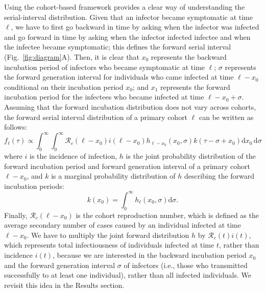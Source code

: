\documentclass[12pt]{article}
\newcommand{\fref}[1]{Fig.~\ref{fig:#1}}
\begin{document}
Using the cohort-based framework provides a clear way of understanding the serial-interval distribution.
Given that an infector became symptomatic at time $\ell$, we have to first go backward in time by asking when the infector was infected and go forward in time by asking when the infector infected infectee and when the infectee became symptomatic;
this defines the forward serial interval (\fref{diagram}A).
Then, it is clear that $x_0$ represents the backward incubation period of infectors who became symptomatic at time $\ell$; 
$\sigma$ represents the forward generation interval for individuals who came infected at time $\ell - x_0$ conditional on their incubation period $x_0$;
and $x_1$ represents the forward incubation period for the infectees who became infected at time $\ell - x_0 + \sigma$.
Assuming that the forward incubation distribution does not vary across cohorts, the forward serial interval distribution of a primary cohort $\ell$ can be written as follows:
\begin{equation}
f_\ell(\tau) \propto \int_{0}^\infty \int_{0}^\infty \mathcal R_c (\ell - x_0) i(\ell - x_0) h_{\ell - x_0}(x_0, \sigma) k(\tau-\sigma+x_0) \mathrm{d} x_0\, \mathrm{d}\sigma
\end{equation}
where $i$ is the incidence of infection, $h$ is the joint probability distribution of the forward incubation period and forward generation interval of a primary cohort $\ell - x_0$, and $k$ is a marginal probability distribution of $h$ describing the forward incubation periods:
\begin{equation}
k(x_0) = \int_0^\infty h_\ell(x_0, \sigma) \mathrm{d}\sigma.
\end{equation}
Finally, $\mathcal R_c (\ell - x_0)$ is the cohort reproduction number, which is defined as the average secondary number of cases caused by an individual infected at time $\ell - x_0$.
We have to multiply the joint forward distribution $h$ by $\mathcal R_c (t) i(t)$, which represents total infectiousness of individuals infected at time $t$, rather than incidence $i(t)$, because we are interested in the backward incubation period $x_0$ and the forward generation interval $\sigma$ of infectors (i.e., those who transmitted successfully to at least one individual), rather than all infected individuals.
We revisit this idea in the Results section.
\end{document}
